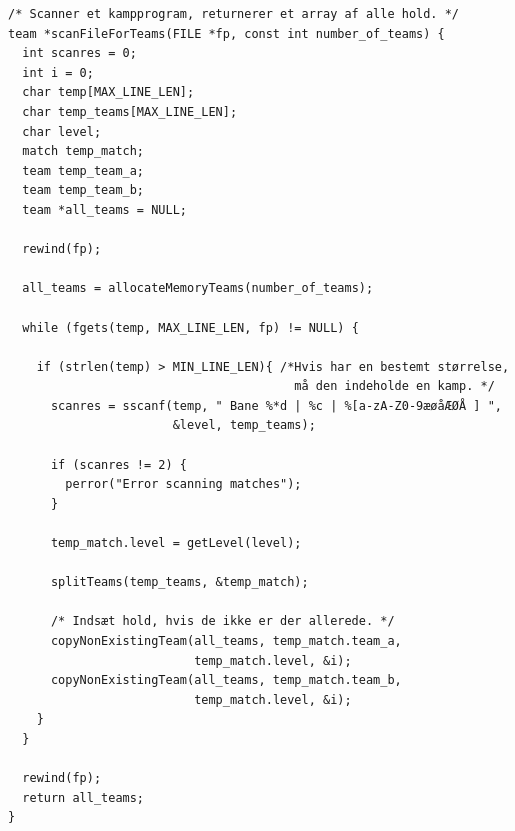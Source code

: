\begin{listing}[H]
\begin{verbatim}
/* Scanner et kampprogram, returnerer et array af alle hold. */
team *scanFileForTeams(FILE *fp, const int number_of_teams) {
  int scanres = 0;
  int i = 0;
  char temp[MAX_LINE_LEN];
  char temp_teams[MAX_LINE_LEN];
  char level;
  match temp_match;
  team temp_team_a;
  team temp_team_b;
  team *all_teams = NULL;

  rewind(fp);

  all_teams = allocateMemoryTeams(number_of_teams);

  while (fgets(temp, MAX_LINE_LEN, fp) != NULL) {

    if (strlen(temp) > MIN_LINE_LEN){ /*Hvis har en bestemt størrelse, 
                                        må den indeholde en kamp. */
      scanres = sscanf(temp, " Bane %*d | %c | %[a-zA-Z0-9æøåÆØÅ ] ",
                       &level, temp_teams);

      if (scanres != 2) {
        perror("Error scanning matches");
      }

      temp_match.level = getLevel(level);

      splitTeams(temp_teams, &temp_match);

      /* Indsæt hold, hvis de ikke er der allerede. */
      copyNonExistingTeam(all_teams, temp_match.team_a,
                          temp_match.level, &i);
      copyNonExistingTeam(all_teams, temp_match.team_b,
                          temp_match.level, &i);
    }
  }

  rewind(fp);
  return all_teams;
}
\end{verbatim}
\label{code:scanFileForTeams}
\end{listing}

